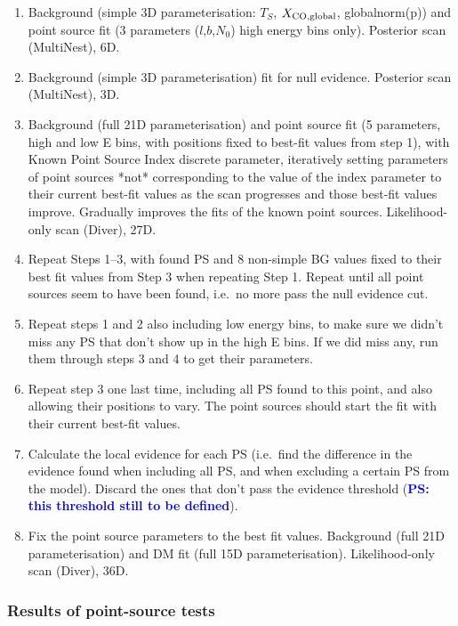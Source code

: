 \documentclass{article}
\newcommand{\ps}[1]{\textcolor{blue}{{\bf PS: #1}}}
\begin{document}
\begin{enumerate}
\item Background (simple 3D parameterisation: $T_S$, $X_{\rm CO, global}$, globalnorm(p)) and point source fit (3 parameters ($l$,$b$,$N_0$) high energy bins only).  Posterior scan (MultiNest), 6D.
\item Background (simple 3D parameterisation) fit for null evidence.  Posterior scan (MultiNest), 3D.
\item Background (full 21D parameterisation) and point source fit (5 parameters, high and low E bins, with positions fixed to best-fit values from step 1), with Known Point Source Index discrete parameter, iteratively setting parameters of point sources *not* corresponding to the value of the index parameter to their current best-fit values as the scan progresses and those best-fit values improve.  Gradually improves the fits of the known point sources.  Likelihood-only scan (Diver), 27D.
\item Repeat Steps 1--3, with found PS and 8 non-simple BG values fixed to their best fit values from Step 3 when repeating Step 1.  Repeat until all point sources seem to have been found, i.e.\ no more pass the null evidence cut.
\item Repeat steps 1 and 2 also including low energy bins, to make sure we didn't miss any PS that don't show up in the high E bins.  If we did miss any, run them through steps 3 and 4 to get their parameters.
\item Repeat step 3 one last time, including all PS found to this point, and also allowing their positions to vary.  The point sources should start the fit with their current best-fit values.
\item Calculate the local evidence for each PS (i.e.\ find the difference in the evidence found when including all PS, and when excluding a certain PS from the model). Discard the ones that don't pass the evidence threshold (\ps{this threshold still to be defined}).
\item Fix the point source parameters to the best fit values.  Background (full 21D parameterisation) and DM fit (full 15D parameterisation).  Likelihood-only scan (Diver), 36D.

\end{enumerate}

\subsubsection{Results of point-source tests}
\end{document}
